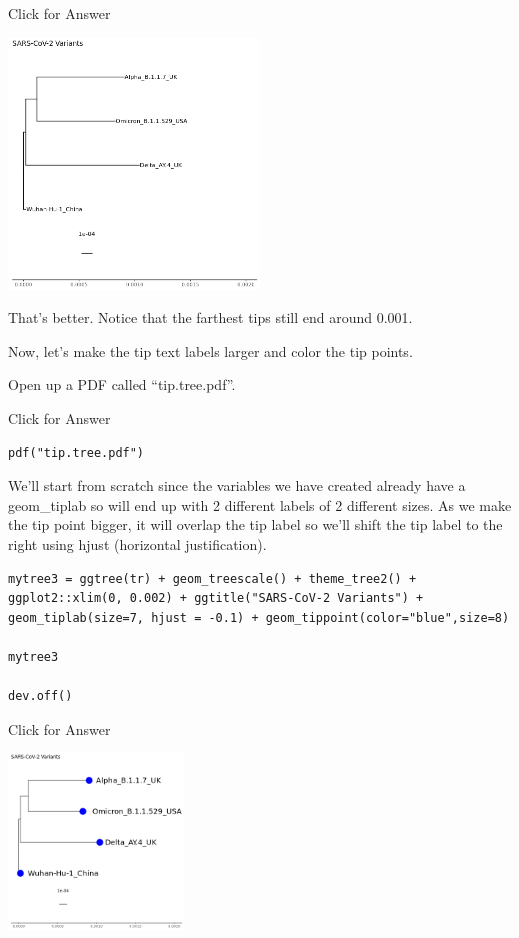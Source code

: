\documentclass[
]{book}
\begin{document}
Click for Answer

\includegraphics[width=0.5\textwidth,height=\textheight]{./Figures/scaled.tree.png}

\hfill\break

That's better. Notice that the farthest tips still end around 0.001.

Now, let's make the tip text labels larger and color the tip points.

Open up a PDF called ``tip.tree.pdf''.

Click for Answer

\begin{verbatim}
pdf("tip.tree.pdf")
\end{verbatim}

\hfill\break

We'll start from scratch since the variables we have created already have a geom\_tiplab so will end up with 2 different labels of 2 different sizes. As we make the tip point bigger, it will overlap the tip label so we'll shift the tip label to the right using hjust (horizontal justification).

\begin{verbatim}
mytree3 = ggtree(tr) + geom_treescale() + theme_tree2() + ggplot2::xlim(0, 0.002) + ggtitle("SARS-CoV-2 Variants") + geom_tiplab(size=7, hjust = -0.1) + geom_tippoint(color="blue",size=8)

mytree3

dev.off()
\end{verbatim}

Click for Answer

\includegraphics[width=0.35\textwidth,height=\textheight]{./Figures/tip.tree.png}
\end{document}

